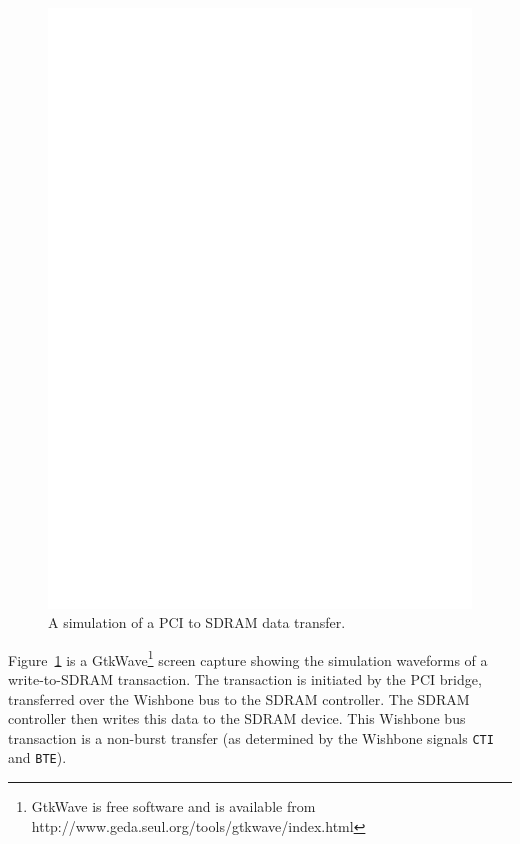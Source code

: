 \begin{figure}[h!]
\includegraphics[width=\linewidth]{images/pci_to_sdram_xfer.eps}
\caption[A simulation of a PCI to SDRAM data transfer]{A simulation of a PCI to
SDRAM data transfer.}
\label{MEM_GtkWave_SDRAM}
\end{figure}

Figure~\ref{MEM_GtkWave_SDRAM} is a GtkWave\footnote{GtkWave is free software and
is available from http://www.geda.seul.org/tools/gtkwave/index.html} screen
capture showing the simulation waveforms of a write-to-SDRAM transaction. The
transaction is initiated by the PCI bridge, transferred over the Wishbone bus to
the SDRAM controller. The SDRAM controller then writes this data to the SDRAM
device. This Wishbone bus transaction is a non-burst transfer (as determined by
the Wishbone signals \texttt{CTI} and \texttt{BTE}).

